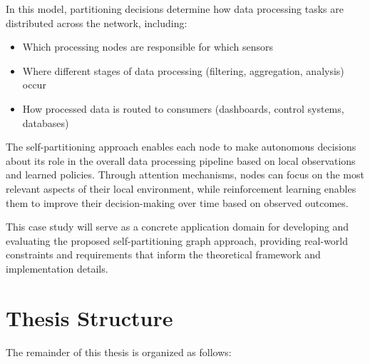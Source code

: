 \documentclass{article}
\begin{document}
In this model, partitioning decisions determine how data processing tasks are distributed across the network, including:

\begin{itemize}
    \item Which processing nodes are responsible for which sensors
    \item Where different stages of data processing (filtering, aggregation, analysis) occur
    \item How processed data is routed to consumers (dashboards, control systems, databases)
\end{itemize}

The self-partitioning approach enables each node to make autonomous decisions about its role in the overall data processing pipeline based on local observations and learned policies. Through attention mechanisms, nodes can focus on the most relevant aspects of their local environment, while reinforcement learning enables them to improve their decision-making over time based on observed outcomes.

This case study will serve as a concrete application domain for developing and evaluating the proposed self-partitioning graph approach, providing real-world constraints and requirements that inform the theoretical framework and implementation details.

\section{Thesis Structure}

The remainder of this thesis is organized as follows:
\end{document}
